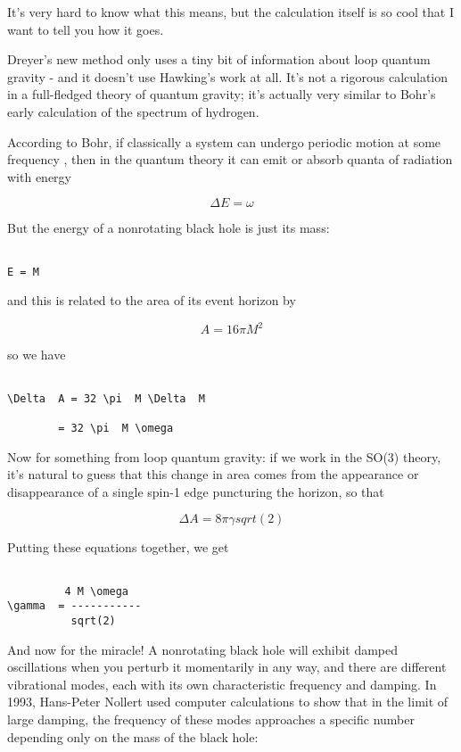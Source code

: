 It's very hard to know what this means, but the calculation itself is so
cool that I want to tell you how it goes.

Dreyer's new method only uses a tiny bit of information about loop
quantum gravity - and it doesn't use Hawking's work at all.  It's not a
rigorous calculation in a full-fledged theory of quantum gravity; it's
actually very similar to Bohr's early calculation of the spectrum of
hydrogen.

According to Bohr, if classically a system can undergo periodic motion
at some frequency \omega , then in the quantum theory it can emit or
absorb quanta of radiation with energy 


$$

\Delta  E = \omega  
$$
    
But the energy of a nonrotating black hole is just its mass:


\begin{verbatim}

E = M
\end{verbatim}
    
and this is related to the area of its event horizon by


$$

A = 16 \pi  M^{2}
$$
    
so we have


\begin{verbatim}

\Delta  A = 32 \pi  M \Delta  M

        = 32 \pi  M \omega 
\end{verbatim}
    
Now for something from loop quantum gravity: if we work in the
SO(3) theory, it's natural to guess that this change in area
comes from the appearance or disappearance of a single spin-1
edge puncturing the horizon, so that


$$

\Delta  A = 8 \pi  \gamma  sqrt(2)
$$
    
Putting these equations together, we get


\begin{verbatim}

         4 M \omega          
\gamma  = -----------
          sqrt(2)
\end{verbatim}
    
And now for the miracle!  A nonrotating black hole will exhibit damped
oscillations when you perturb it momentarily in any way, and there are
different vibrational modes, each with its own characteristic frequency
and damping.  In 1993, Hans-Peter Nollert used computer calculations to show
that in the limit of large damping, the frequency of these modes
approaches a specific number depending only on the mass of the black
hole:


